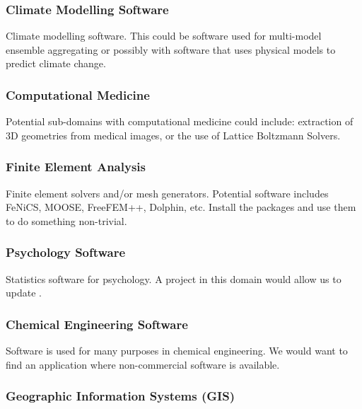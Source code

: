 \documentclass[12pt]{article}
\begin{document}
\subsubsection{Climate Modelling Software}

Climate modelling software.  This could be software used for multi-model
ensemble aggregating \citep{SamoulyEtAl2018} or possibly with software that uses
physical models to predict climate change.

\subsubsection{Computational Medicine}

Potential sub-domains with computational medicine could include: extraction of
3D geometries from medical images, or the use of Lattice Boltzmann
Solvers.  %

\subsubsection{Finite Element Analysis}

Finite element solvers and/or mesh generators.  Potential
software includes FeNiCS, MOOSE, FreeFEM++, Dolphin, etc.  Install the packages
and use them to do something non-trivial.  %

\subsubsection{Psychology Software}

Statistics software for psychology.  A project in this domain would allow us to
update \citet{SmithEtAl2018_StatSoft}. %

\subsubsection{Chemical Engineering Software}

Software is used for many purposes in chemical engineering.  We would want to
find an application where non-commercial software is available.

\subsubsection{Geographic Information Systems (GIS)}
\end{document}
